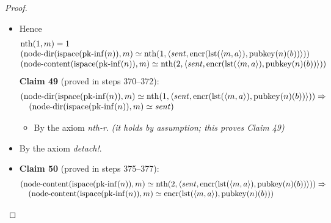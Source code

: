 \documentclass[11pt]{article}
\theoremstyle{plain}
\begin{document}
\begin{proof}
\begin{itemize}[leftmargin=2.8em, itemsep=4pt, parsep=1pt]
\begin{itemize}[leftmargin=2.8em, itemsep=4pt, parsep=1pt]
  \item[\textbf{366--369}] Hence 
\begin{equation*}
\begin{array}{@{}l@{}}
\operatorname{nth}(1, m) = 1 \\
(\operatorname{node\text{-}dir}(\operatorname{ispace}(\operatorname{pk\text{-}inf}(n)), m) \simeq \operatorname{nth}(1, \langle \mathit{sent}, \operatorname{encr}(\operatorname{lst}(\langle m, a \rangle), \operatorname{pubkey}(n)(b)) \rangle)) \\
(\operatorname{node\text{-}content}(\operatorname{ispace}(\operatorname{pk\text{-}inf}(n)), m) \simeq \operatorname{nth}(2, \langle \mathit{sent}, \operatorname{encr}(\operatorname{lst}(\langle m, a \rangle), \operatorname{pubkey}(n)(b)) \rangle))
\end{array}
\end{equation*}
\textbf{Claim 49} (proved in steps 370--372):
\begin{equation*}
\begin{array}{@{}l@{}} (\operatorname{node\text{-}dir}(\operatorname{ispace}(\operatorname{pk\text{-}inf}(n)), m) \simeq \operatorname{nth}(1, \langle \mathit{sent}, \operatorname{encr}(\operatorname{lst}(\langle m, a \rangle), \operatorname{pubkey}(n)(b)) \rangle)) \Rightarrow  \\ \quad (\operatorname{node\text{-}dir}(\operatorname{ispace}(\operatorname{pk\text{-}inf}(n)), m) \simeq \mathit{sent}) \end{array}
\end{equation*}

  \begin{itemize}[leftmargin=2.8em, itemsep=4pt, parsep=1pt]
  \item[\textbf{370--372}] By the axiom \emph{nth-r}.  \emph{(it holds by assumption; this proves Claim 49)}
  \end{itemize}
  \item[\textbf{373}] By the axiom \emph{detach!}.
  \item[\textbf{374}] \textbf{Claim 50} (proved in steps 375--377):
\begin{equation*}
\begin{array}{@{}l@{}} (\operatorname{node\text{-}content}(\operatorname{ispace}(\operatorname{pk\text{-}inf}(n)), m) \simeq \operatorname{nth}(2, \langle \mathit{sent}, \operatorname{encr}(\operatorname{lst}(\langle m, a \rangle), \operatorname{pubkey}(n)(b)) \rangle)) \Rightarrow  \\ \quad (\operatorname{node\text{-}content}(\operatorname{ispace}(\operatorname{pk\text{-}inf}(n)), m) \simeq \operatorname{encr}(\operatorname{lst}(\langle m, a \rangle), \operatorname{pubkey}(n)(b))) \end{array}
\end{equation*}


\end{itemize}
\end{itemize}
\end{proof}
\end{document}
